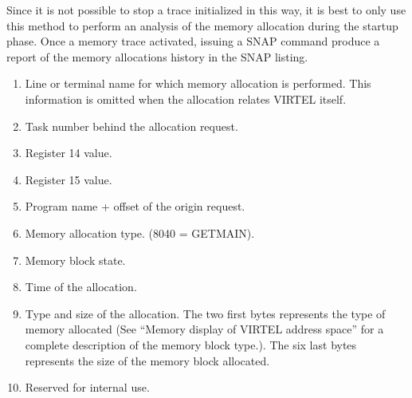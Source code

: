 \documentclass[letterpaper,10pt,english]{sphinxmanual}
\begin{document}
\sphinxAtStartPar
Since it is not possible to stop a trace initialized in this way, it is best to only use this method to perform an analysis of the memory allocation during the startup phase.
Once a memory trace activated, issuing a SNAP command produce a report of the memory allocations history in the SNAP listing.

\sphinxAtStartPar
{}

\sphinxAtStartPar
{}
\begin{description}
\begin{enumerate}
%
\item {} 
\sphinxAtStartPar
Line or terminal name for which memory allocation is performed. This information is omitted when the allocation relates VIRTEL itself.

\item {} 
\sphinxAtStartPar
Task number behind the allocation request.

\item {} 
\sphinxAtStartPar
Register 14 value.

\item {} 
\sphinxAtStartPar
Register 15 value.

\item {} 
\sphinxAtStartPar
Program name + offset of the origin request.

\item {} 
\sphinxAtStartPar
Memory allocation type. (8040 = GETMAIN).

\item {} 
\sphinxAtStartPar
Memory block state.

\item {} 
\sphinxAtStartPar
Time of the allocation.

\item {} 
\sphinxAtStartPar
Type and size of the allocation. The two first bytes represents the type of memory allocated (See “Memory display of VIRTEL address space” for a complete description of the memory block type.). The six last bytes represents the size of the memory block allocated.

\item {} 
\sphinxAtStartPar
Reserved for internal use.

\end{enumerate}

\end{description}
\end{document}

